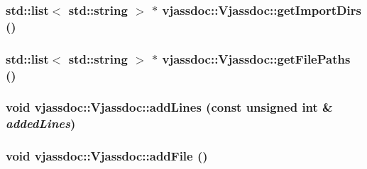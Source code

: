 \hypertarget{classvjassdoc_1_1Vjassdoc_556e1fe15a58becec3da4e281bf73f09}{
\subsubsection{\setlength{\rightskip}{0pt plus 5cm}std::list$<$ std::string $>$ $\ast$ vjassdoc::Vjassdoc::getImportDirs ()}}
\label{classvjassdoc_1_1Vjassdoc_556e1fe15a58becec3da4e281bf73f09}


\hypertarget{classvjassdoc_1_1Vjassdoc_6b27e1cf9a3a03f9d8d2157e4b831a29}{
\subsubsection{\setlength{\rightskip}{0pt plus 5cm}std::list$<$ std::string $>$ $\ast$ vjassdoc::Vjassdoc::getFilePaths ()}}
\label{classvjassdoc_1_1Vjassdoc_6b27e1cf9a3a03f9d8d2157e4b831a29}


\hypertarget{classvjassdoc_1_1Vjassdoc_af08606e734200e4c99860a6867216e5}{
\subsubsection{\setlength{\rightskip}{0pt plus 5cm}void vjassdoc::Vjassdoc::addLines (const unsigned int \& {\em addedLines})}}
\label{classvjassdoc_1_1Vjassdoc_af08606e734200e4c99860a6867216e5}


\hypertarget{classvjassdoc_1_1Vjassdoc_7aa83fb64697927220f66616cf30e982}{
\subsubsection{\setlength{\rightskip}{0pt plus 5cm}void vjassdoc::Vjassdoc::addFile ()}}
\label{classvjassdoc_1_1Vjassdoc_7aa83fb64697927220f66616cf30e982}


